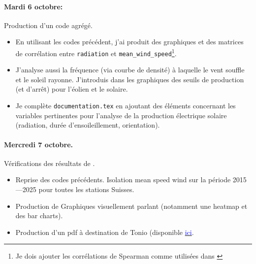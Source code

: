 \documentclass[11pt, a4paper]{article}
\begin{document}
\paragraph{Mardi 6 octobre:} Production d'un code agrégé.
\begin{itemize}
    \item En utilisant les codes précédent, j'ai produit des graphiques et des matrices de corrélation entre \texttt{radiation} et \texttt{mean\_wind\_speed}\footnote{Je dois ajouter les corrélations de Spearman comme utilisées dans \cite{cauz2025embracing}}. 
    \item J'analyse aussi la fréquence (via courbe de densité) à laquelle le vent souffle et le soleil rayonne. J'introduis dans les graphiques des seuils de production (et d'arrêt) pour l'éolien et le solaire.
    \item Je complète \texttt{documentation.tex} en ajoutant des éléments concernant les variables pertinentes pour l'analyse de la production électrique solaire (radiation, durée d'ensoileillement, orientation).
\end{itemize}

\paragraph{Mercredi 7 octobre.} Vérifications des résultats de \citet{cauz2025embracing}.
\begin{itemize}
    \item Reprise des codes précédents. Isolation mean speed wind sur la période 2015---2025 pour toutes les stations Suisses.
    \item Production de Graphiques visuellement parlant (notamment une heatmap et des bar charts).
    \item Production d'un pdf à destination de Tonio (disponible \href{https://github.com/LeLubb/Predoc-HEG/blob/main/Code/toy_code/sides_analysis/Wind_seasonality.pdf}{\textcolor{blue}{ici}}.
\end{itemize}
\end{document}
